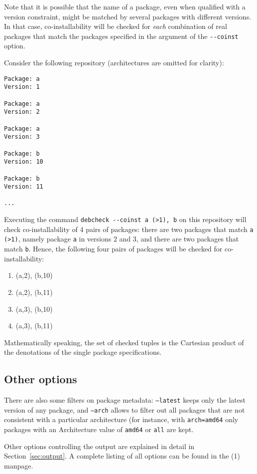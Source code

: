 Note that it is possible that the name of a package, even when
qualified with a version constraint, might be matched by several
packages with different versions. In that case, co-installability will
be checked for \emph{each} combination of real packages that match the
packages specified in the argument of the \verb|--coinst| option.
\begin{example}
  Consider the following repository (architectures are omitted for
  clarity):
\begin{verbatim}
Package: a
Version: 1

Package: a 
Version: 2

Package: a
Version: 3

Package: b
Version: 10

Package: b
Version: 11

...
\end{verbatim}
Executing the command \verb|debcheck --coinst a (>1), b| on this
repository will check co-installability of 4 pairs of packages: there
are two packages that match \verb|a (>1)|, namely package \texttt{a} in
versions 2 and 3, and there are two packages that match \texttt{b}. Hence,
the following four pairs of packages will be checked for co-installability:
\begin{enumerate}
\item (a,2), (b,10)
\item (a,2), (b,11)
\item (a,3), (b,10)
\item (a,3), (b,11)
\end{enumerate}
\end{example}

Mathematically speaking, the set of checked tuples is the Cartesian product
of the denotations of the single package specifications.

\subsection{Other options}
There are also some filters on package metadata: \texttt{--latest}
keeps only the latest version of any package, and \texttt{--arch}
allows to filter out all packages that are not consistent with a
particular architecture (for instance, with \texttt{arch=amd64} only
packages with an Architecture value of \texttt{amd64} or \texttt{all}
are kept. 

Other options controlling the output are explained in detail in
Section~\ref{sec:output}. A complete listing of all options can be found in
the \debcheck(1) manpage.


